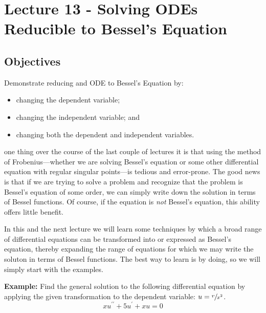 \chapter{Lecture 13 - Solving ODEs Reducible to Bessel's Equation}
\label{ch:lec13}
\section{Objectives}
Demonstrate reducing and ODE to Bessel's Equation by:
\begin{itemize}
\item changing the dependent variable;
\item changing the independent variable; and
\item changing both the dependent and independent variables.
\end{itemize}

 one thing over the course of the last couple of lectures it is that using the method of Frobenius---whether we are solving Bessel's equation or some other differential equation with regular singular points---is tedious and error-prone.  The good news is that if we are trying to solve a problem and recognize that the problem is Bessel's equation of some order, we can simply write down the solution in terms of Bessel functions.  Of course, if the equation is \emph{not} Bessel's equation, this ability offers little benefit.

In this and the next lecture we will learn some techniques by which a broad range of differential equations can be transformed into or expressed as Bessel's equation, thereby expanding the range of equations for which we may write the soluton in terms of Bessel functions.  The best way to learn is by doing, so we will simply start with the examples.

\vspace{0.5cm}

\noindent\textbf{Example:} Find the general solution to the following differential equation by applying the given transformation to the dependent variable: $u = \sfrac{v}{x^2}$.
\begin{equation*}
xu^{\prime \prime} + 5u^{\prime} + xu = 0
\end{equation*}

\vspace{4.0cm}

